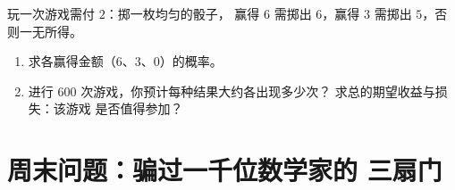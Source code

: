\begin{exercise}[$\star\star\star$]\label{exo:g10:proba:9}
玩一次游戏需付 $2$：掷一枚均匀的骰子，
赢得 $6$ 需掷出 $6$，赢得 $3$ 需掷出 $5$，否则一无所得。
\begin{enumerate}
  \item 求各赢得金额（$6$、$3$、$0$）的概率。
  \item 进行 $600$ 次游戏，你预计每种结果大约各出现多少次？
        求总的期望收益与损失：该游戏
        是否值得参加？
\end{enumerate}
\end{exercise}

\section{周末问题：骗过一千位数学家的
三扇门}

